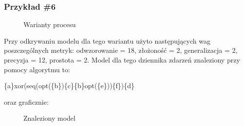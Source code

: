 \subsubsection{Przykład \#6}
\begin{figure}[!ht]
	\caption{\label{fig:flow_chart}Warianty procesu}
\end{figure}

Przy odkrywaniu modelu dla tego wariantu użyto następujących wag poszczególnych metryk: odwzorowanie = 18, złożoność = 2, generalizacja = 2, precyzja = 12, prostota = 2. Model dla tego dziennika zdarzeń znaleziony przy pomocy algorytmu to:
\begin{center}
	\{a\}xor(seq(opt(\{b\})\{c\}\{b\}opt(\{e\}))\{f\})\{d\}
\end{center}
oraz graficznie:

\begin{figure}[!ht]
	\caption{\label{fig:flow_chart}Znaleziony model}
\end{figure}

